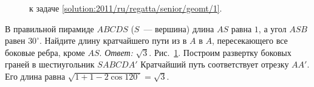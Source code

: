 \ifsolution
\begin{figure}\centering
    \caption{к задаче \ref{solution:2011/ru/regatta/senior/geomt/1}.}
    \label{fig:solution:2011/ru/regatta/senior/geomt/1}
\end{figure}
\fi %

\problem
В правильной пирамиде $ABCDS$ ($S$~--- вершина) длина $AS$ равна $1$, а угол
$ASB$ равен $30^\circ$.
Найдите длину кратчайшего пути из в $A$ в $A$, пересекающего все боковые ребра,
кроме $AS$.
\solution
\label{solution:2011/ru/regatta/senior/geomt/1}%
\emph{Ответ:} $\sqrt{3}$.
Рис.~\ref{fig:solution:2011/ru/regatta/senior/geomt/1}.
Построим развертку боковых граней в шестиугольник $SABCDA'$
Кратчайший путь соответствует отрезку $AA'$.
Его длина равна $\sqrt{1 + 1 - 2 \cos 120^\circ} = \sqrt{3}$.
\endproblem
